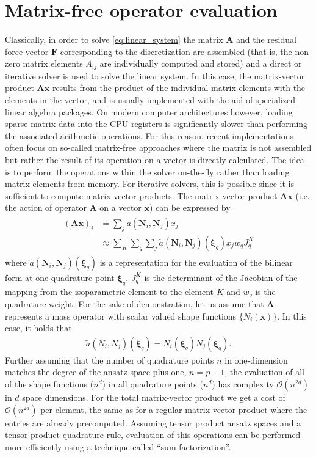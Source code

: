 \documentclass[AMA,STIX1COL]{WileyNJD-v2}
\newcommand*{\gz}[1]{\boldsymbol{#1}}
\begin{document}
\section{Matrix-free operator evaluation}
\label{sec:mf}
Classically, in order to solve \eqref{eq:linear_system} the matrix $\gz A$ and the residual force vector $\gz F$ corresponding to the discretization are assembled
(that is, the non-zero matrix elements $A_{ij}$ are individually computed and stored) and a direct or iterative solver is used to solve the linear system.
In this case, the matrix-vector product $\gz A \gz x$ results from the product of the individual matrix elements with the elements in the vector,
and is usually implemented with the aid of specialized linear algebra packages.
On modern computer architectures however, loading sparse matrix data into the CPU registers is significantly slower than performing the associated arithmetic operations.
For this reason, recent implementations often focus on so-called matrix-free approaches \cite{kronbichler12, kronbichler2017fast} where the matrix is not
assembled but rather the result of its operation on a vector is directly calculated.
The idea is to perform the operations within the solver on-the-fly rather than loading matrix elements from memory.
For iterative solvers, this is possible since it is sufficient to compute matrix-vector products.
%
The matrix-vector product $\gz A \gz x$ (i.e. the action of operator $\gz A$ on a vector $\gz x$) can be expressed by
\begin{align}
  \begin{split}
 (\gz A \gz x)_i &= \sum_j a(\gz N_i,\gz N_j) x_j \\
        &\approx \sum_K \sum_q \sum_j \tilde{a}(\gz N_i,\gz N_j)(\gz \xi_q) x_j w_q J^K_q
  \end{split}
  \label{eq:mf_vmult}
\end{align}
where $\tilde{a}(\gz N_i,\gz N_j)(\gz \xi_q)$ is a representation for the evaluation of the bilinear form at one quadrature point $\gz \xi_q$, $J^K_q$ is the
determinant of the Jacobian of the mapping from the isoparametric element to the element $K$ and
$w_q$ is the quadrature weight.
For the sake of demonstration, let us assume that $\gz A$ represents a mass operator with scalar valued shape functions $\{ N_i(\gz x) \}$. In this case, it holds that
\begin{align*}
 \tilde{a}(N_i,N_j)(\gz \xi_q) = N_i(\gz \xi_q)N_j(\gz \xi_q).
\end{align*}
Further assuming that the number of quadrature points $n$ in one-dimension matches the degree of the ansatz space plus one, $n=p+1$,
the evaluation of all of the shape functions ($n^d$)
in all quadrature points ($n^d$) has complexity $\mathcal{O}(n^{2d})$ in $d$ space dimensions.
For the total matrix-vector product we get a cost of $\mathcal{O}(n^{2d})$ per element,
the same as for a regular matrix-vector product where the entries are already precomputed.
Assuming tensor product ansatz spaces and a tensor product quadrature rule, evaluation of this operations can be performed more efficiently using a technique called ``sum factorization''.
\end{document}
